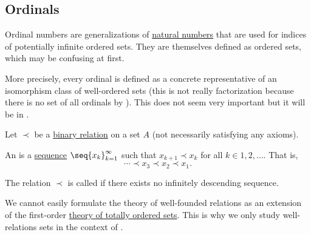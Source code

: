 \subsection{Ordinals}\label{subsec:ordinals}

\begin{remark}\label{rem:ordinal_is_equivalence_class}
  Ordinal numbers are generalizations of \hyperref[def:set_of_natural_numbers]{natural numbers} that are used for indices of potentially infinite ordered sets. They are themselves defined as ordered sets, which may be confusing at first.

  More precisely, every ordinal is defined as a concrete representative of an isomorphism class of well-ordered sets (this is not really factorization because there is no set of all ordinals by ). This does not seem very important but it will be in .
\end{remark}

\begin{definition}\label{def:well_founded_relation}
  Let \( \prec \) be a \hyperref[def:binary_relation]{binary relation} on a set \( A \) (not necessarily satisfying any axioms).

  An  is a \hyperref[def:sequence]{sequence} \( \seq{ x_k }_{k=1}^\infty \) such that \( x_{k+1} \prec x_k \) for all \( k \in 1, 2, \ldots \). That is,
  \begin{equation*}
    \cdots \prec x_3 \prec x_2 \prec x_1.
  \end{equation*}

  The relation \( \prec \) is called  if there exists no infinitely descending sequence.

  We cannot easily formulate the theory of well-founded relations as an extension of the first-order \hyperref[def:totally_ordered_set]{theory of totally ordered sets}. This is why we only study well-relations sets in the context of .
\end{definition}


